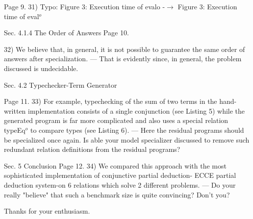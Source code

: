 Page 9.
31) Typo:
  Figure 3: Execution time of evalo -$\to$ Figure 3: Execution time of eval$^o$

Sec. 4.1.4 The Order of Answers
Page 10.

32) We believe that, in general, it is not possible to guarantee the same order of answers after specialization.
 --- That is evidently since, in general, the problem discussed is undecidable.

Sec. 4.2 Typechecker-Term Generator

Page 11.
33) For example, typechecking of the sum of two terms in the hand-written implementation consists of a single conjunction (see Listing 5) while the generated program is far more complicated and also uses a special relation typeEq$^o$ to compare types (see Listing 6).
 --- Here the residual programs should be specialized once again. Is able your model specializer discussed to remove such redundant relation definitions from the residual programs?

Sec. 5 Conclusion
Page 12.
34) We compared this approach with the most sophisticated implementation of conjunctive partial deduction- ECCE partial deduction system-on 6 relations which solve 2 different problems.
 --- Do your really "believe" that such a benchmark size is quite convincing? Don't you?

Thanks for your enthusiasm.
